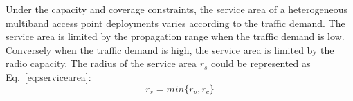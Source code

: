 

Under the capacity and coverage constraints, the service area of a heterogeneous multiband access point deployments
varies according to the traffic demand. The service area is limited by the propagation range when the traffic 
demand is low. Conversely when the traffic demand is high, the service area is limited by the radio capacity.
The radius of the service area $r_s$ could be represented as Eq.~\ref{eq:servicearea}:
\begin{equation}
\label{eq:servicearea}
r_s=min\{r_p,r_c\}
\end{equation}

